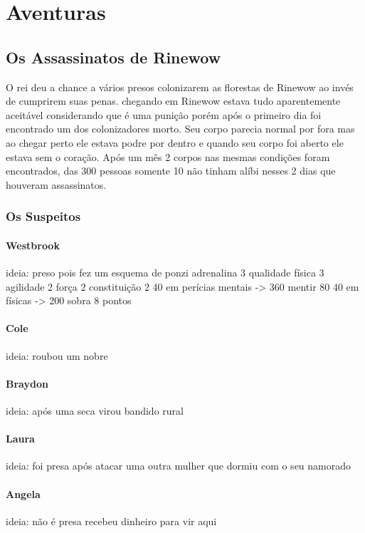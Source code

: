 \part{Aventuras}
\chapter{Os Assassinatos de Rinewow}
O rei deu a chance a vários presos colonizarem as florestas de Rinewow
ao invés de cumprirem suas penas.
chegando em Rinewow estava tudo aparentemente aceitável considerando que é uma punição
porém após o primeiro dia foi encontrado um dos colonizadores morto.
Seu corpo parecia normal por fora mas ao chegar perto ele estava podre por dentro e quando seu corpo foi aberto ele estava sem o coração.
Após um mês 2 corpos nas mesmas condições foram encontrados,
das 300 pessoas somente 10 não tinham alíbi
nesses 2 dias que houveram assassinatos.
% 
\section{Os Suspeitos}
\subsection{Westbrook}
ideia: preso pois fez um esquema de ponzi
adrenalina 3 qualidade física 3 agilidade 2  força 2 constituição 2 
40 em perícias mentais -> 360  mentir 80 
40 em físicas -> 200 
sobra 8 pontos 
\subsection{Cole}
ideia: roubou um nobre
\subsection{Braydon}
ideia: após uma seca virou bandido rural 
\subsection{Laura}
ideia: foi presa após atacar uma outra mulher que dormiu com o seu namorado
\subsection{Angela}
ideia: não é presa recebeu dinheiro para vir aqui
